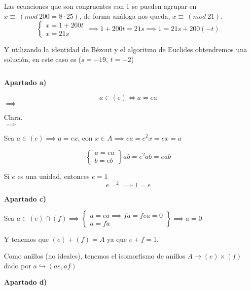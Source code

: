 \documentclass[openany]{book}
\begin{document}
\begin{exercise}
    Las ecuaciones que son congruentes con 1 se pueden agrupar en $ x \equiv\ (mod\ 200 = 8\cdot 25) $, de forma análoga nos queda, $ x\equiv\ (mod\ 21) $.
    $$ \left\{
    \begin{array}{l}
        x = 1+200t\\ 
        x = 21s
    \end{array}
    \right.
    \implies 1+200t = 21s \implies 1 = 21s+200(-t) $$

    Y utilizando la identidad de Bézout y el algoritmo de Euclides obtendremos una solución, en este caso es ($ s = -19,\ t = -2 $)

\end{exercise}

\setcounter{ex}{11}
\begin{exercise}$  $
    \begin{flushright}
        \textbf{Apartado a)}
    \end{flushright}
    
    $$ a \in (e) \iff a = ea $$
    $ \implies $

    Clara.\\
    $ \implies $
    
    Sea $ a \in (e) \implies a = ex $, con $ x \in A \implies ea = e^2x = ex = a $

    $$ \left\{
    \begin{array}{l}
        a = ea\\ b = eb
    \end{array}
    \right\} ab = e^2 ab = eab $$
    
    Si $ e  $ es una unidad, entonces $ e = 1 $
    $$ e = ^2 \implies 1 = e $$

    \begin{flushright}
        \textbf{Apartado c)}
    \end{flushright}
    Sea $ a \in (e) \cap (f) \implies \left\{
    \begin{array}{l}
        a = ea\implies fa = fea = 0 \\ a = fa 
    \end{array}
    \right\} \implies a = 0 $

    Y tenemos que $ (e)+(f) = A $ ya que $ e+f = 1 $.

    Como anillos (no ideales), tenemos el isomorfismo de anillos $ A \to (e) \times (f) $ dado por $ a\hookrightarrow (ae,af) $

    \begin{flushright}
        \textbf{Apartado d)}
    \end{flushright}
    

\end{exercise}
\end{document}
